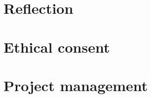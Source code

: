 \documentclass[10pt,a4paper]{article}
\begin{document}
\section{Reflection}

\section{Ethical consent}

\section{Project management}



\appendix


\end{document}
